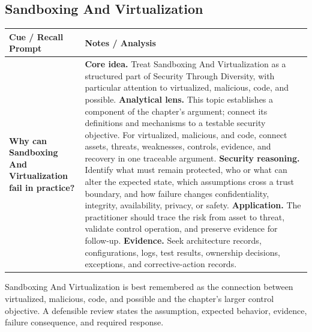 \documentclass[11pt]{article}
\newcommand{\CornellHeader}{%
\rowcolor{Navy}\color{white}\bfseries Cue / Recall Prompt & \color{white}\bfseries Notes / Analysis\\\hline}
\newcommand{\CornellRow}[2]{%
\cellcolor{CueGray}\RaggedRight\textbf{#1} & \RaggedRight #2\\\hline}
\begin{document}
\subsection*{Sandboxing And Virtualization}
\begin{longtable}{>{\RaggedRight\arraybackslash}p{}|>{\RaggedRight\arraybackslash}p{}}
\CornellHeader
\CornellRow{Why can Sandboxing And Virtualization fail in practice?}{\textbf{Core idea.} Treat Sandboxing And Virtualization as a structured part of Security Through Diversity, with particular attention to virtualized, malicious, code, and possible. \textbf{Analytical lens.} This topic establishes a component of the chapter's argument; connect its definitions and mechanisms to a testable security objective. For virtualized, malicious, and code, connect assets, threats, weaknesses, controls, evidence, and recovery in one traceable argument. \textbf{Security reasoning.} Identify what must remain protected, who or what can alter the expected state, which assumptions cross a trust boundary, and how failure changes confidentiality, integrity, availability, privacy, or safety. \textbf{Application.} The practitioner should trace the risk from asset to threat, validate control operation, and preserve evidence for follow-up. \textbf{Evidence.} Seek architecture records, configurations, logs, test results, ownership decisions, exceptions, and corrective-action records.}
\end{longtable}
\begin{topicsummary}
Sandboxing And Virtualization is best remembered as the connection between virtualized, malicious, code, and possible and the chapter's larger control objective. A defensible review states the assumption, expected behavior, evidence, failure consequence, and required response.
\end{topicsummary}
\end{document}
